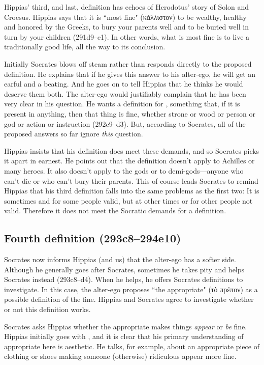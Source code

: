 \documentclass[11pt]{article}
\begin{document}
Hippias' third, and last, definition has echoes of Herodotus' story of Solon
and Croesus.  Hippias says that it is ``most fine" ({\g κάλλιστον}) to be
wealthy, healthy and honored by the Greeks, to bury your parents well and to be
buried well in turn by your children (291d9--e1).  In other words, what is most
fine is to live a traditionally good life, all the way to its conclusion.

Initially Socrates blows off steam rather than responds directly to the
proposed definition.  He explains that if he gives this answer to his
alter-ego, he will get an earful and a beating.  And he goes on to tell Hippias
that he thinks he would deserve them both.  The alter-ego would justifiably
complain that he has been very clear in his question. He wants a definition for
, something that, if it is present in anything, then that
thing is fine, whether strone or wood or person or god or action or instruction
(292c9--d3).  But, according to Socrates, all of the proposed answers so far
ignore \emph{this} question.

Hippias insists that his definition does meet these demands, and so Socrates
picks it apart in earnest.  He points out that the definition doesn't apply to
Achilles or many heroes.  It also doesn't apply to the gods or to
demi-gods---anyone who can't die or who can't bury their parents.  This of
course leads Socrates to remind Hippias that his third definition falls into
the same problems as the first two: It is sometimes and for some people valid,
but at other times or for other people not valid.  Therefore it does not meet
the Socratic demands for a definition.


\subsection{Fourth definition (293c8--294e10)}

Socrates now informs Hippias (and us) that the alter-ego has a softer side.
Although he generally goes after Socrates, sometimes he takes pity and helps
Socrates instead (293c8--d4).  When he helps, he offers Socrates definitions to
investigate.  In this case, the alter-ego proposes ``the appropriate" (τὸ
πρέπον) as a possible definition of the fine. Hippias and Socrates agree to
investigate whether or not this definition works.

Socrates asks Hippias whether the appropriate makes things \emph{appear} or
\emph{be} fine.  Hippias initially goes with , and it is clear
that his primary understanding of appropriate here is aesthetic.  He talks, for
example, about an appropriate piece of clothing or shoes making someone
(otherwise) ridiculous appear more fine.
\end{document}
